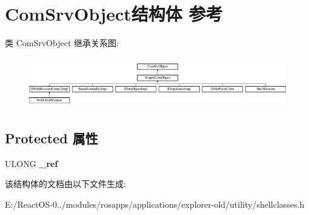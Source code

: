 \hypertarget{struct_com_srv_object}{}\section{Com\+Srv\+Object结构体 参考}
\label{struct_com_srv_object}
类 Com\+Srv\+Object 继承关系图\+:\begin{figure}[H]
\begin{center}
\leavevmode
\includegraphics[height=2.222222cm]{struct_com_srv_object}
\end{center}
\end{figure}
\subsection*{Protected 属性}
\begin{DoxyCompactItemize}
\item 
\mbox{\label{struct_com_srv_object_a9387a721f386f12106aba79ba65217da}} 
U\+L\+O\+NG {\bfseries \+\_\+ref}
\end{DoxyCompactItemize}


该结构体的文档由以下文件生成\+:\begin{DoxyCompactItemize}
\item 
E\+:/\+React\+O\+S-\/0../modules/rosapps/applications/explorer-\/old/utility/shellclasses.\+h\end{DoxyCompactItemize}
